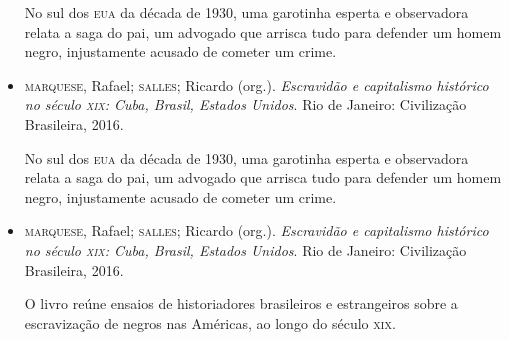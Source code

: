 \documentclass[12pt]{extarticle}
\begin{document}
\begin{itemize}
No sul dos \textsc{eua} da década de 1930, uma garotinha esperta e observadora
relata a saga do pai, um advogado que arrisca tudo para defender um
homem negro, injustamente acusado de cometer um crime.

\item\textsc{marquese}, Rafael; \textsc{salles}; Ricardo (org.). \textit{Escravidão e
  capitalismo histórico no século \textsc{xix}: Cuba, Brasil, Estados Unidos}.
  Rio de Janeiro: Civilização Brasileira, 2016.

No sul dos \textsc{eua} da década de 1930, uma garotinha esperta e observadora
relata a saga do pai, um advogado que arrisca tudo para defender um
homem negro, injustamente acusado de cometer um crime.

\item\textsc{marquese}, Rafael; \textsc{salles}; Ricardo (org.). \textit{Escravidão e capitalismo histórico no século \textsc{xix}: Cuba, Brasil, Estados Unidos}. Rio de Janeiro: Civilização Brasileira, 2016.

O livro reúne ensaios de historiadores brasileiros e estrangeiros sobre
a escravização de negros nas Américas, ao longo do século \textsc{xix}.
\end{itemize}
\end{document}
